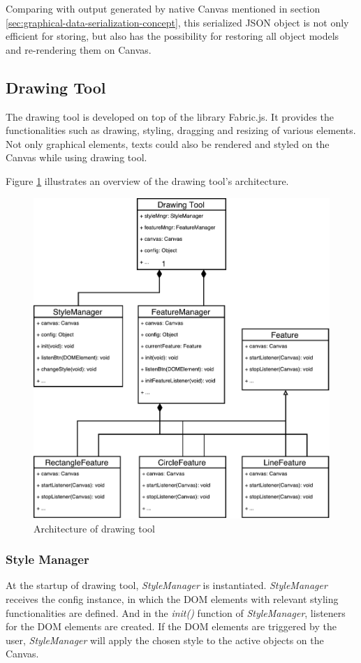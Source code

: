 Comparing with output generated by native Canvas mentioned in section \ref{sec:graphical-data-serialization-concept}, this serialized JSON object is not only efficient for storing, but also has the possibility for restoring all object models and re-rendering them on Canvas.

\subsection{Drawing Tool}
The drawing tool is developed on top of the library Fabric.js. It provides the functionalities such as drawing, styling, dragging and resizing of various elements. Not only graphical elements, texts could also be rendered and styled on the Canvas while using drawing tool.

Figure \ref{fig:drawing-tool-arch-imp} illustrates an overview of the drawing tool's architecture. 

\begin{figure}[!htbp]
  \centering
    \includegraphics[width=1\textwidth]{Figures/imp-drawing-tool-arch.pdf}
  \caption{Architecture of drawing tool}
  \label{fig:drawing-tool-arch-imp}
\end{figure}

\subsubsection{Style Manager}
At the startup of drawing tool, \textit{StyleManager} is instantiated. \textit{StyleManager} receives the config instance, in which the DOM elements with relevant styling functionalities are defined. And in the \textit{init()} function of \textit{StyleManager}, listeners for the DOM elements are created. If the DOM elements are triggered by the user, \textit{StyleManager} will apply the chosen style to the active objects on the Canvas.

